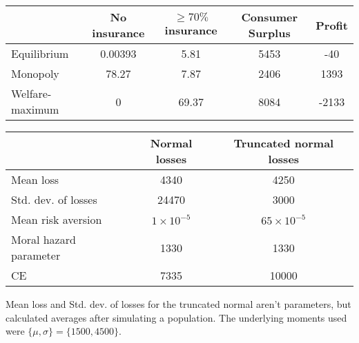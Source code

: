 \documentclass[10pt]{article}
\begin{document}
\begin{center}
\begin{tabular}{|lcccc|}
\hline
 & No insurance & $\geq 70 \%$ insurance & Consumer Surplus & Profit\\
\hline
Equilibrium & 0.00393 & 5.81 & 5453 & -40\\
Monopoly & 78.27 & 7.87 & 2406 & 1393\\
Welfare-maximum & 0 & 69.37 & 8084 & -2133\\
\hline
\end{tabular}
\end{center}

\begin{center}
    \begin{tabular}{|lcc|}
    \hline
         &  Normal losses & Truncated normal losses\\
         \hline
        Mean loss & 4340 & 4250 \\
        Std. dev. of losses & 24470 & 3000\\
        Mean risk aversion & $1\times10^{-5}$ & $65\times10^{-5}$  \\
        Moral hazard parameter & 1330 & 1330 \\ 
        CE & 7335 & 10000 \\
        \hline
    \end{tabular}
\end{center}

Mean loss and Std. dev. of losses for the truncated normal aren't parameters, but calculated averages after simulating a population. The underlying moments used were $\{\mu, \sigma\} = \{1500, 4500\}.$ 
\end{document}
